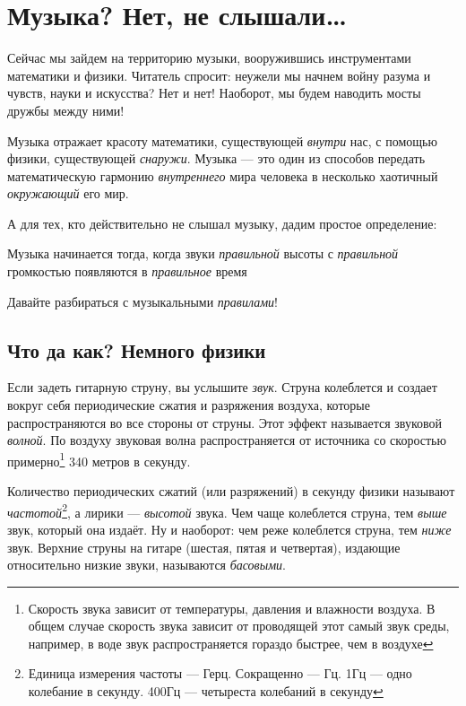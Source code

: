 \chapter{Музыка? Нет, не слышали\ldots}
\label{ch:music}

Сейчас мы зайдем на территорию музыки, вооружившись инструментами математики и физики. Читатель спросит: неужели мы начнем войну разума и чувств, науки и искусства? Нет и нет! Наоборот, мы будем наводить мосты дружбы между ними! 

Музыка отражает красоту математики, существующей \emph{внутри} нас, с помощью физики, существующей \emph{снаружи}. Музыка --- это один из способов передать математическую гармонию \emph{внутреннего} мира человека в несколько хаотичный \emph{окружающий} его мир.

А для тех, кто действительно не слышал музыку, дадим простое определение:

\begin{Definition}[Музыка]
    Музыка начинается тогда, когда звуки \emph{правильной} высоты с \emph{правильной} громкостью появляются в \emph{правильное} время
\end{Definition}

Давайте разбираться с музыкальными \emph{правилами}!


\section{Что да как? Немного физики}
\label{ch:music:physics}

Если задеть гитарную струну, вы услышите \emph{звук}. Струна колеблется и создает вокруг себя периодические сжатия и разряжения воздуха, которые распространяются во все стороны от струны. Этот эффект называется звуковой \emph{волной}. По воздуху звуковая волна распространяется от источника со скоростью примерно\footnote{Скорость звука зависит от температуры, давления и влажности воздуха. В общем случае скорость звука зависит от проводящей этот самый звук среды, например, в воде звук распространяется гораздо быстрее, чем в воздухе} 340 метров в секунду.

Количество периодических сжатий (или разряжений) в секунду физики называют \emph{частотой}\footnote{Единица измерения частоты --- Герц. Сокращенно --- Гц. 1Гц --- одно колебание в секунду. 400Гц --- четыреста колебаний в секунду}, а лирики --- \emph{высотой} звука. Чем чаще колеблется струна, тем \emph{выше} звук, который она издаёт. Ну и наоборот: чем реже колеблется струна, тем \emph{ниже} звук. Верхние струны на гитаре (шестая, пятая и четвертая), издающие относительно низкие звуки, называются \emph{басовыми}.

